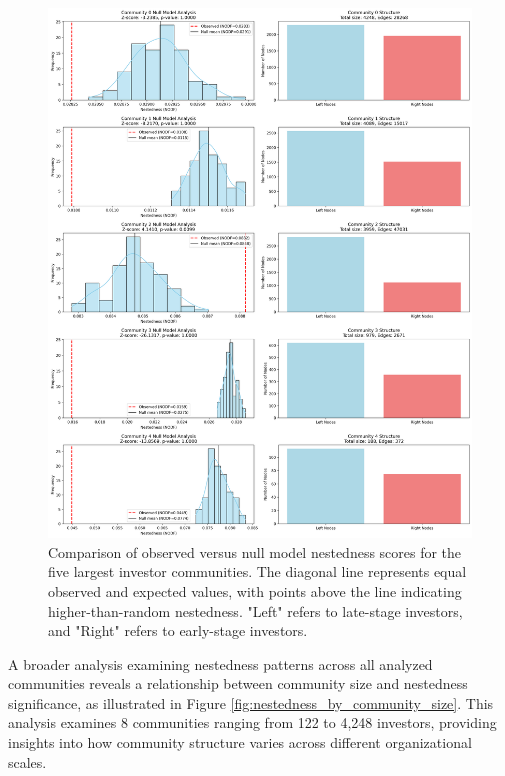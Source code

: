 \begin{figure}[htp]
\centering
\includegraphics[width=1\textwidth]{../figures/us/significant_communities_detailed.png}
\caption{Comparison of observed versus null model nestedness scores for the five largest investor communities. The diagonal line represents equal observed and expected values, with points above the line indicating higher-than-random nestedness. "Left" refers to late-stage investors, and "Right" refers to early-stage investors.}
\label{fig:nestedness_comparison}
\end{figure}

A broader analysis examining nestedness patterns across all analyzed communities reveals a relationship between community size and nestedness significance, as illustrated in Figure \ref{fig:nestedness_by_community_size}. This analysis examines 8 communities ranging from 122 to 4,248 investors, providing insights into how community structure varies across different organizational scales.

